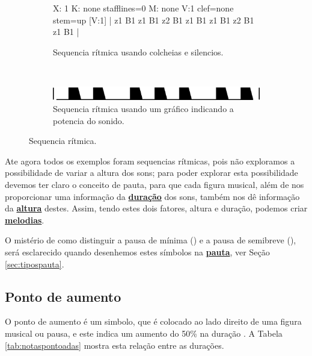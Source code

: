 \begin{figure}[h]
    \centering
    \begin{subfigure}[b]{0.9\textwidth}
 \begin{abc}[name=abc-figurasexample2]
%
X: 1 %
K: none stafflines=0 %
M:  none %
V:1 clef=none stem=up %
%
[V:1] | z1 B1 z1 B1 z2 B1 z1 B1 z1 B1 z2 B1  z1 B1   |
%       
\end{abc}
	\caption{Sequencia rítmica usando  colcheias e silencios.}
	\label{fig:abc-figurasexample2}
    \end{subfigure}
    ~%
    \begin{subfigure}[b]{0.9\textwidth}
        \includegraphics[width=\textwidth]{chapters/cap-musica-basica/forma-figurasexample2.eps}
        \caption{Sequencia rítmica usando um gráfico indicando a potencia do sonido.}
        \label{fig:forma-figurasexample2}
    \end{subfigure}
    \caption{Sequencia rítmica.}\label{fig:total-figurasexample2}
\end{figure}


Ate agora todos os exemplos foram sequencias rítmicas, 
pois não exploramos a possibilidade de variar a altura dos sons;
para poder explorar esta possibilidade devemos ter claro o conceito de pauta,
para que cada figura musical, 
além de nos proporcionar uma informação da \hyperref[sec:pos:Duracion]{\textbf{duração}}  dos sons, 
também nos dê informação da \hyperref[sec:pos:Altura]{\textbf{altura}} destes. 
Assim, tendo estes dois fatores, altura e duração, podemos criar \hyperref[sec:pos:Melodia]{\textbf{melodias}}.

\begin{tcbattention}
O mistério de como distinguir a pausa de mínima (\HaPa) e a pausa de semibreve (\GaPa),
será esclarecido quando desenhemos estes símbolos na \hyperref[sec:pauta]{\textbf{pauta}}, ver Seção \ref{sec:tipospauta}.
\end{tcbattention}

\subsection{Ponto de aumento}
\label{subsec:pontoaumento}
O ponto de aumento é um simbolo, que é colocado ao lado direito de uma figura musical ou pausa, 
e este indica um aumento do 50\% na duração \cite[pp. 25]{cardoso1973curso}.
A Tabela \ref{tab:notaspontoadas} mostra esta relação entre as durações.

